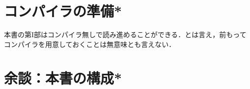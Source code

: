 \documentclass[a5paper,twoside,fleqn,draft]{jsbook}
\begin{document}


\section{\haskell コンパイラの準備*}

本書の第I部は\haskell コンパイラ無しで読み進めることができる．とは言え，前もって\haskell コンパイラを用意しておくことは無意味とも言えない．





\section{余談：本書の構成*}
\end{document}

